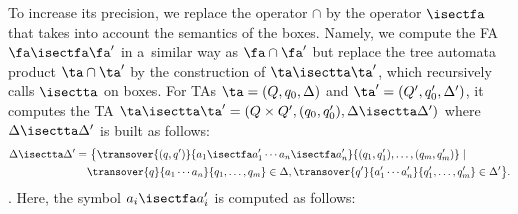 To increase its precision, we replace the operator $\cap$ by the operator $\isectfa$ that takes into account the semantics of the boxes.
%
Namely, we compute the FA $\fa\isectfa\fa'$ in a~similar way as $\fa\cap\fa'$ but replace the tree
automata product $\ta\cap\ta'$ by the construction of $\ta\isectta\ta'$, which recursively calls $\isectta$ on boxes.
For TAs $\ta = (Q, q_0, \Delta)$ and $\ta' = (Q',q_0', \Delta')$, it computes the  TA
$\ta\isectta\ta' = (Q \times Q', (q_0, q_0'), \Delta\isectta\Delta')$ where
$\Delta\isectta\Delta'$ is built as follows:
    \begin{align*}
    \Delta\isectta\Delta' = &\  \big\{  \transover{(q, q')}{a_1\isectfa a_1'\cdots a_n\isectfa a_n'}{(q_1, q'_1), \ldots,
      (q_m, q'_m)} \mid\\ & \transover{q}{a_1\cdots a_n}{q_1, \ldots, q_m}
      \in \Delta,
      \transover{q'}{a_1'\cdots a_n'}{q'_1, \ldots, q'_m} \in \Delta'
      \big\}.
    \end{align*}.
    Here, the symbol $a_i\isectfa a_i'$ is computed as follows:
